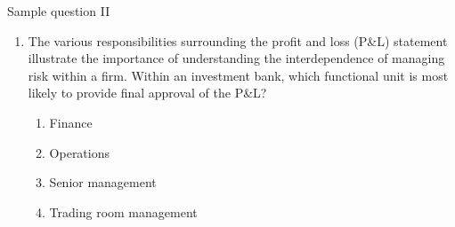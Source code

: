 \begin{frame}{Sample question II}

\begin{enumerate}
	\item The various responsibilities surrounding the profit and loss (P\&L) statement
	illustrate the importance of understanding the interdependence of managing risk
	within a firm. Within an investment bank, which functional unit is most likely to
	provide final approval of the P\&L?
	\begin{enumerate}[A]
		\item Finance
		\item Operations
		\item Senior management
		\item {\color{red} Trading room management}
	\end{enumerate}
\end{enumerate}

\end{frame}



